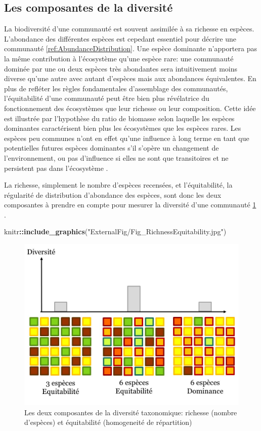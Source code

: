 \documentclass[
  11pt,
  french,
  A4paper,
  extrafontsizes,onecolumn,openright
  ]{memoir}
\newenvironment{Shaded}{\begin{snugshade}}{\end{snugshade}}
\newcommand{\KeywordTok}[1]{\textcolor[rgb]{0.13,0.29,0.53}{\textbf{#1}}}
\newcommand{\StringTok}[1]{\textcolor[rgb]{0.31,0.60,0.02}{#1}}
\newcommand{\OperatorTok}[1]{\textcolor[rgb]{0.81,0.36,0.00}{\textbf{#1}}}
\newcommand{\NormalTok}[1]{#1}
\begin{document}
\subsection{Les composantes de la
diversité}\label{les-composantes-de-la-diversite}

La biodiversité d'une communauté est souvent assimilée à sa richesse en
espèces. L'abondance des différentes espèces est cepedant essentiel pour
décrire une communauté \ref{ref:AbundanceDistribution}. Une espèce
dominante n'apportera pas la même contribution à l'écosystème qu'une
espèce rare: une communauté dominée par une ou deux espèces très
abondantes sera intuitivement moins diverse qu'une autre avec autant
d'espèces mais aux abondances équivalentes. En plus de refléter les
règles fondamentales d'assemblage des communautés, l'équitabilité d'une
communauté peut être bien plus révélatrice du fonctionnement des
écosystèmes que leur richesse ou leur composition. Cette idée est
illustrée par l'hypothèse du ratio de biomasse selon laquelle les
espèces dominantes caractérisent bien plus les écosystèmes que les
espèces rares. Les espèces peu communes n'ont en effet qu'une influence
à long terme en tant que potentielles futures espèces dominantes s'il
s'opère un changement de l'environnement, ou pas d'influence si elles ne
sont que transitoires et ne persistent pas dans l'écosystème
\autocite{Grime1998}.

La richesse, simplement le nombre d'espèces recensées, et
l'équitabilité, la régularité de distribution d'abondance des espèces,
sont donc les deux composantes à prendre en compte pour mesurer la
diversité d'une communauté \ref{fig:RichEqu}
\autocites{Whittaker1965}{Magurran2004}.

\begin{Shaded}
\begin{Highlighting}[]
\NormalTok{knitr}\OperatorTok{::}\KeywordTok{include_graphics}\NormalTok{(}\StringTok{"ExternalFig/Fig_RichnessEquitability.jpg"}\NormalTok{)}
\end{Highlighting}
\end{Shaded}

\begin{figure}

{\centering \includegraphics[width=0.6\linewidth]{ExternalFig/Fig_RichnessEquitability} 

}

\caption{Les deux composantes de la diversité taxonomique: richesse (nombre d'espèces) et équitabilité (homogeneité de répartition)}\label{fig:RichEqu}
\end{figure}
\end{document}
